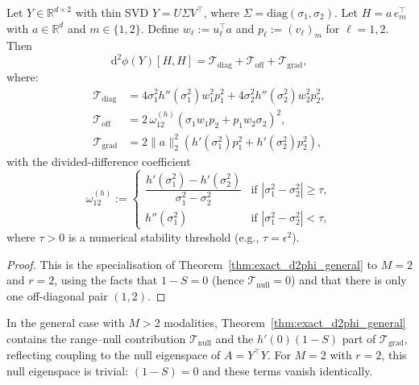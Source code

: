 \begin{theorem}
\label{thm:exact_d2phi}
Let $Y \in \mathbb{R}^{d \times 2}$ with thin SVD $Y = U \Sigma V^\top$, where $\Sigma = \mathrm{diag}(\sigma_1, \sigma_2)$. Let $H = a \, e_m^\top$ with $a \in \mathbb{R}^d$ and $m\in\{1,2\}$. Define $w_\ell := u_\ell^\top a$ and $p_\ell := (v_\ell)_m$ for $\ell = 1, 2$. Then
\begin{equation}
\mathrm{d}^2 \phi(Y)[H, H] = \mathcal{T}_{\mathrm{diag}} + \mathcal{T}_{\mathrm{off}} + \mathcal{T}_{\mathrm{grad}},
\end{equation}
where:
\begin{align}
\mathcal{T}_{\mathrm{diag}} &= 4 \sigma_1^2 h''(\sigma_1^2) w_1^2 p_1^2 + 4 \sigma_2^2 h''(\sigma_2^2) w_2^2 p_2^2, \label{eq:T_diag} \\
\mathcal{T}_{\mathrm{off}} &= 2 \, \omega_{12}^{(h)} \left( \sigma_1 w_1 p_2 + p_1 w_2 \sigma_2 \right)^2, \label{eq:T_off} \\
\mathcal{T}_{\mathrm{grad}} &= 2 \|a\|_2^2 \left( h'(\sigma_1^2) p_1^2 + h'(\sigma_2^2) p_2^2 \right), \label{eq:T_grad}
\end{align}
with the divided-difference coefficient
\begin{equation}
\omega_{12}^{(h)} := \begin{cases} \dfrac{h'(\sigma_1^2) - h'(\sigma_2^2)}{\sigma_1^2 - \sigma_2^2} & \text{if } |\sigma_1^2 - \sigma_2^2| \geq \tau, \\[10pt] h''(\sigma_1^2) & \text{if } |\sigma_1^2 - \sigma_2^2| < \tau, \end{cases}
\label{eq:omega_12}
\end{equation}
where $\tau > 0$ is a numerical stability threshold (e.g., $\tau = \epsilon^2$).
\end{theorem}

\begin{proof}
This is the specialisation of Theorem~\ref{thm:exact_d2phi_general} to $M=2$ and $r=2$, using the facts that $1-S=0$ (hence $\mathcal{T}_{\mathrm{null}}=0$) and that there is only one off-diagonal pair $(1,2)$.
\end{proof}

\begin{remark}[Absence of null-space terms for $M=2$]
In the general case with $M>2$ modalities, Theorem~\ref{thm:exact_d2phi_general} contains the range--null contribution $\mathcal{T}_{\mathrm{null}}$ and the $h'(0)(1-S)$ part of $\mathcal{T}_{\mathrm{grad}}$, reflecting coupling to the null eigenspace of $A=Y^\top Y$.  For $M=2$ with $r=2$, this null eigenspace is trivial: $(1-S)=0$ and these terms vanish identically.
\end{remark}

